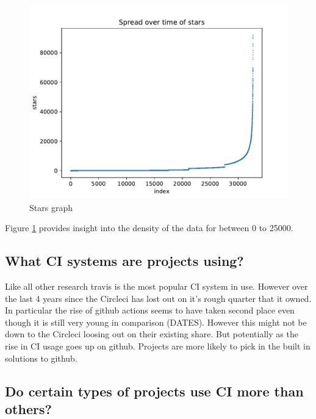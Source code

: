 \documentclass[twoside,12pt,titlepage,a4paper]{article}
\begin{document}
\begin{figure}[!htbp]
  \centering
  \includegraphics[width=\textwidth]{../src/results/spread over time.pdf}
  \caption[alt text]{Stars graph}
  \label{graph_scatter_stars_line}
\end{figure}

Figure \ref{graph_scatter_stars_line} provides insight into the density of the data for between 0 to 25000.

\vspace*{-0.05in}
\subsection{What CI systems are projects using?}
\vspace*{-0.05in}
Like all other research travis is the most popular CI system in use. However over the last 4 years since the \cite{Github2017} Circleci has lost out on it's rough quarter that it owned. In particular the rise of github actions seems to have taken second place even though it is still very young in comparison (DATES). However this might not be down to the Circleci loosing out on their existing share. But potentially as the rise in CI usage goes up on github. Projects are more likely to pick in the built in solutions to github.


\pagebreak
\vspace*{-0.05in}
\subsection{Do certain types of projects use CI more than others?}  
\vspace*{-0.05in}
\end{document}
